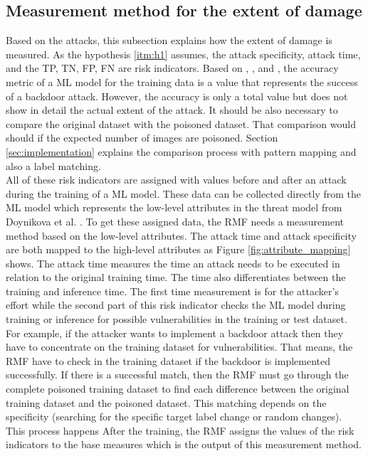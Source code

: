 \subsection{Measurement method for the extent of damage}
\label{sec:ext_dmg}

Based on the attacks, this subsection explains how the extent of damage is measured. As the hypothesis \ref{itm:h1} assumes, the attack specificity, attack time, and the TP, TN, FP, FN are risk indicators. Based on \cite{DBLP:journals/corr/abs-1708-06733}, \cite{turner2018clean}, and \cite{DBLP:journals/corr/abs-1910-00033}, the accuracy metric of a ML model for the training data is a value that represents the success of a backdoor attack. However, the accuracy is only a total value but does not show in detail the actual extent of the attack. It should be also necessary to compare the original dataset with the poisoned dataset. That comparison would should if the expected number of images are poisoned. Section \ref{sec:implementation} explains the comparison process with pattern mapping and also a label matching. \\
All of these risk indicators are assigned with values before and after an attack during the training of a ML model. These data can be collected directly from the ML model which represents the low-level attributes in the threat model from Doynikova et al. \cite{DBLP:conf/crisis/DoynikovaNGK20}. To get these assigned data, the RMF needs a measurement method based on the low-level attributes. The attack time and attack specificity are both mapped to the high-level attributes as Figure \ref{fig:attribute_mapping} shows. The attack time measures the time an attack needs to be executed in relation to the original training time. The time also differentiates between the training and inference time. The first time measurement is for the attacker's effort while the second part of this risk indicator checks the ML model during training or inference for possible vulnerabilities \cite{DBLP:journals/csur/RosenbergSER21} in the training or test dataset. For example, if the attacker wants to implement a backdoor attack then they have to concentrate on the training dataset for vulnerabilities. That means, the RMF have to check in the training dataset if the backdoor is implemented successfully. If there is a successful match, then the RMF must go through the complete poisoned training dataset to find each difference between the original training dataset and the poisoned dataset. This matching depends on the specificity (searching for the specific target label change or random changes). This process happens After the training, the RMF assigns the values of the risk indicators to the base measures which is the output of this measurement method.

